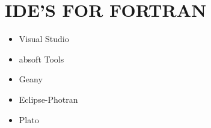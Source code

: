 \documentclass{article}
\begin{document}
	\section*{IDE'S FOR FORTRAN}
	\begin{itemize}
		\item Visual Studio
		\item absoft Tools
		\item Geany
		\item Eclipse-Photran
		\item Plato
	\end{itemize}
\end{document}
